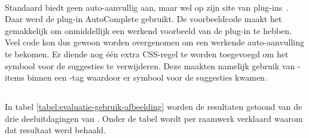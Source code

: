 \paragraph{\lungo}
Standaard biedt \lungo{} geen auto-aanvullig aan, maar wel op zijn site van plug-ins~\cite{TapQuo2013b}.
Daar werd de plug-in AutoComplete gebruikt.
De voorbeeldcode maakt het gemakkelijk om onmiddellijk een werkend voorbeeld van de plug-in te hebben.
Veel code kon dus gewoon worden overgenomen om een werkende auto-aanvulling te bekomen.
Er diende nog één extra CSS-regel te worden toegevoegd om het symbool voor de suggesties te verwijderen.
Deze maakten namelijk gebruik van -items binnen een -tag waardoor er symbool voor de suggesties kwamen.



\subsection{}
\label{sec:evaluatie-gebruik-afbeelding}

In tabel \ref{tabel:evaluatie-gebruik-afbeelding} worden de resultaten getoond van de drie deeluitdagingen van .
Onder de tabel wordt per raamwerk verklaard waarom dat resultaat werd behaald.

\begin{table}[H]
\centering
{}
\caption{Gebruik van  voor \st{}~(\sta), \kendo{}~(\kendoa), \jqm{}~(\jqma) en \lungo{}~(\lungoa).}
\label{tabel:evaluatie-gebruik-afbeelding}
\end{table}


